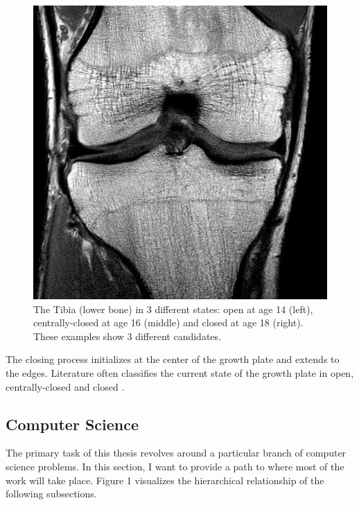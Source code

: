 \begin{figure}[!htb]
\endminipage\hfill
{}%
  \includegraphics[width=\linewidth]{imgs/closed-18y.jpg}
\endminipage
\caption{The Tibia (lower bone) in 3 different states: open at age 14 (left), centrally-closed at age 16 (middle) and closed at age 18 (right). These examples show 3 different candidates.}
\end{figure}

The closing process initializes at the center of the growth plate and extends to the edges.  Literature often classifies the current state of the growth plate in open, centrally-closed and closed \cite{Mauer2015}.

\subsection{Computer Science}

The primary task of this thesis revolves around a particular branch of computer science problems. In this section, I want to provide a path to where most of the work will take place. Figure 1 visualizes the hierarchical relationship of the following subsections.

